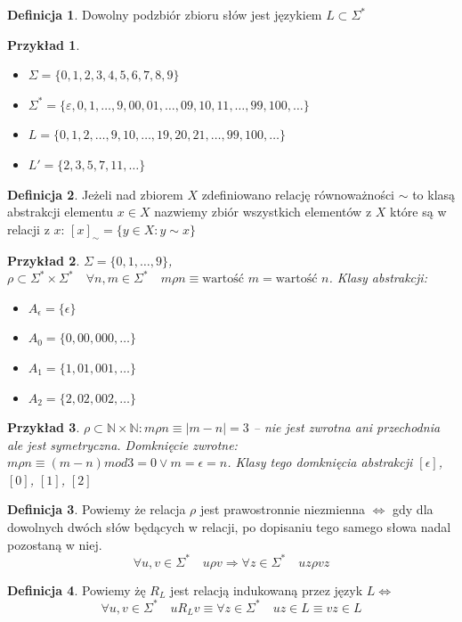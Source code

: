 \documentclass[12pt,a4paper]{article}
\newtheorem{przyklad}{Przykład}
\theoremstyle{definition}
\newtheorem{df}{Definicja}
\begin{document}
	\begin{df}
		Dowolny podzbiór zbioru słów jest językiem $L \subset \Sigma^*$
	\end{df}

	\begin{przyklad}~\\
		\begin{itemize}
			\item $\Sigma = \{0, 1, 2, 3, 4, 5, 6, 7, 8, 9\}$
			\item $\Sigma^* = \{\varepsilon, 0, 1, \dots, 9, 00, 01, \dots, 09, 10, 11, \dots, 99, 100, \dots\}$
			\item $L = \{0, 1, 2, \dots, 9, 10, \dots, 19, 20, 21, \dots, 99, 100, \dots \}$
			\item $L' = \{2, 3, 5, 7, 11, \dots \}$
		\end{itemize}
	\end{przyklad}

	\begin{df}
		Jeżeli nad zbiorem $X$ zdefiniowano relację równoważności $\sim$ to klasą abstrakcji elementu $x\in X$ nazwiemy zbiór wszystkich elementów 
		z $X$ które są w relacji z $x$: $[x]_\sim = \{y\in X: y\sim x\}$
	\end{df}		
	
	\begin{przyklad}
		$\Sigma = \{0, 1, \dots, 9\}$, $\rho \subset \Sigma^* \times \Sigma^* \quad \forall n,m\in \Sigma^* \quad m\rho n \equiv
		 \text{wartość } m = \text{wartość } n$. Klasy abstrakcji: \\
		\begin{itemize}
			\item $A_\epsilon = \{\epsilon\}$
			\item $A_0 = \{0, 00, 000, \dots\}$
			\item $A_1 = \{1, 01, 001, \dots\}$
			\item $A_2 = \{2, 02, 002, \dots\}$
		\end{itemize}
	\end{przyklad}		
	
	\begin{przyklad}
		$\rho \subset \mathbb{N} \times \mathbb{N}:  m\rho n \equiv |m-n| = 3$ -- nie jest zwrotna ani przechodnia ale jest symetryczna.
		Domknięcie zwrotne: $m\rho n \equiv (m-n) mod 3 = 0 \vee m = \epsilon = n$. Klasy tego domknięcia abstrakcji $[\epsilon]$, $[0]$, $[1]$, $[2]$
	\end{przyklad}
	
	\begin{df}
		Powiemy że relacja $\rho$ jest prawostronnie niezmienna $\Leftrightarrow$ gdy dla dowolnych dwóch słów będących w relacji, po dopisaniu
		tego samego słowa nadal pozostaną w niej. 
		$$ \forall u, v \in \Sigma^* \quad u\rho v \Rightarrow \forall z\in\Sigma^* \quad uz \rho vz $$
	\end{df}
	
	\begin{df}
		Powiemy żę $R_L$ jest relacją indukowaną przez język 
		$L \Leftrightarrow$ $$ \forall u,v \in \Sigma^* \quad uR_Lv \equiv \forall z\in \Sigma^* \quad uz\in L \equiv vz\in L$$
	\end{df}		
	
\end{document}
